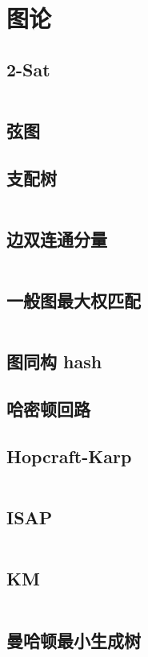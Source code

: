 \twocolumn
\chapter{图论}
\section{2-Sat}
\inputminted{cpp}{./graph-theory/2-sat.cpp}
\section{弦图}

\section{支配树}
\inputminted{cpp}{./graph-theory/dominator-tree.cpp}
\section{边双连通分量}
\inputminted{cpp}{./graph-theory/edge-biconnected-component.cpp}
\section{一般图最大权匹配}
\inputminted{cpp}{./graph-theory/general-graph-maximum-weight-matching.cpp}
\section{图同构 hash}

\section{哈密顿回路}

\section{Hopcraft-Karp}
\inputminted{cpp}{./graph-theory/Hopcraft-Karp.cpp}
\section{ISAP}
\inputminted{cpp}{./graph-theory/ISAP-maximum-flow.cpp}
\section{KM}
\inputminted{cpp}{./graph-theory/KM-Algorithm.cpp}
\section{曼哈顿最小生成树}

